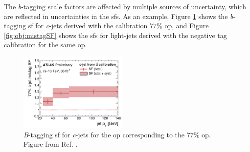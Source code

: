 The \textit{b}-tagging scale factors are affected by multiple sources of uncertainty, which are reflected in uncertainties in the \glspl{sf}.
As an example, Figure \ref{fig:obj:btagSF} shows the \textit{b}-tagging \gls{sf} for \textit{c}-jets derived with the \ttbar calibration 77\% \gls{op}, 
and Figure \ref{fig:obj:mistagSF} shows the \glspl{sf} for light-jets derived with the negative tag calibration for the same \gls{op}.


\begin{figure}[htbp]
\begin{center}
    \includegraphics[width=0.48\textwidth]{figures/objects/cjettt_77SF.png}  %
\end{center}
 \caption{\textit{B}-tagging \gls{sf} for \textit{c}-jets for the \gls{op} corresponding to the 77\% \gls{op}. Figure from Ref. \cite{ATLAS-CONF-2018-001}.}
  \label{fig:obj:btagSF}
\end{figure}

